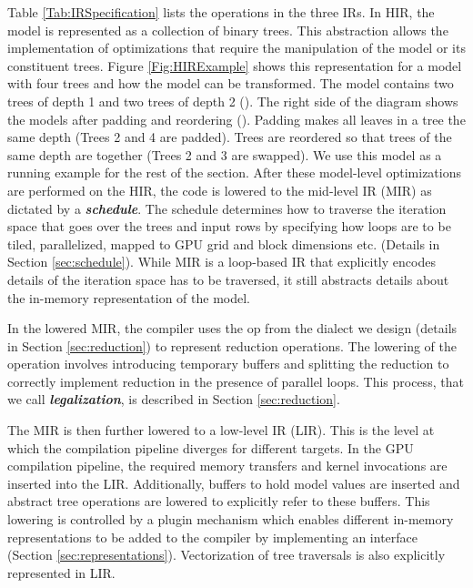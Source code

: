 Table \ref{Tab:IRSpecification} lists the operations in the three IRs. 
In HIR, the model is represented as a collection of binary trees. This abstraction
allows the implementation of optimizations that require the manipulation of the model
or its constituent trees. Figure \ref{Fig:HIRExample} shows this representation for a model 
with four trees and how the model can be transformed. The model contains two trees of 
depth 1 and two trees of depth 2 (). The right side of the diagram shows the models after 
padding and reordering (). Padding makes all leaves in a tree the same depth (Trees 2 and
4 are padded). Trees are reordered so that trees of the same depth are together (Trees 
2 and 3 are swapped). We use this model as a running example for the rest of the section.
After these model-level optimizations are performed on the HIR, the 
code is lowered to the mid-level IR (MIR) as dictated by a  
\emph{\textbf{schedule}}. The schedule determines how to traverse
the iteration space that goes over the trees and input rows 
by specifying how loops are to be tiled, 
parallelized, mapped to GPU grid and block dimensions etc.
(Details in Section \ref{sec:schedule}). While MIR is a loop-based IR that 
explicitly encodes details of the iteration space has to be traversed, 
it still abstracts details about the in-memory representation of the model. 

In the lowered MIR, the compiler uses the  op from 
the  dialect we design (details in Section \ref{sec:reduction})
to represent reduction operations. The lowering of the  operation 
involves introducing temporary buffers and splitting the reduction 
to correctly implement reduction in the presence of 
parallel loops. This process, that we call \textbf{\emph{legalization}}, is 
described in Section \ref{sec:reduction}. 

The MIR is then further lowered to a low-level IR (LIR). This is the
level at which the compilation pipeline diverges for different targets. In 
the GPU compilation pipeline, the required memory transfers and kernel
invocations are inserted into the LIR. Additionally, buffers 
to hold model values are inserted and abstract tree operations are lowered to
explicitly refer to these buffers. This lowering is controlled by 
a plugin mechanism which enables different in-memory representations to 
be added to the compiler by implementing an interface 
(Section \ref{sec:representations}). Vectorization of tree traversals
is also explicitly represented in LIR.

